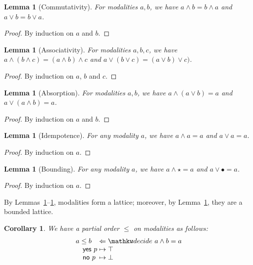 \documentclass{amsart}
\makeatletter
\newtheorem{corollary}[theorem]{Corollary}
\newtheorem{lemma}[theorem]{Lemma}
\newenvironment{proofof}[1][\proofname]{%
  \par\pushQED{\qed}\normalfont%
  \topsep6\p@\@plus6\p@\relax
\trivlist\item[\hskip\labelsep\bfseries#1\@addpunct{.}]%
  \ignorespaces
}{%
  \popQED\endtrivlist\@endpefalse
}
\makeatother
\begin{document}
\begin{lemma}[Commutativity]\label{lem:modality-commutativity}
  For modalities $a, b$, we have $a\land b = b\land a$ and $a\lor b
  = b\lor a$.
\end{lemma}
\begin{proof}
  By induction on $a$ and $b$.
\end{proof}

\begin{lemma}[Associativity]\label{lem:modality-associativity}
  For modalities $a, b, c$, we have $a\land (b\land c) = (a\land b)
  \land c$ and $a\lor (b\lor c) = (a \lor b) \lor c)$.
\end{lemma}
\begin{proof}
  By induction on $a$, $b$ and $c$.
\end{proof}

\begin{lemma}[Absorption]\label{lem:modality-absorption}
  For modalities $a, b$, we have $a\land (a\lor b) = a$ and $a\lor
  (a\land b) = a$.
\end{lemma}
\begin{proof}
  By induction on $a$ and $b$.
\end{proof}

\begin{lemma}[Idempotence]\label{lem:modality-idempotence}
  For any modality $a$, we have $a\land a = a$ and $a\lor a = a$.
\end{lemma}
\begin{proof}
  By induction on $a$.
\end{proof}

\begin{lemma}[Bounding]\label{lem:modality-bounding}
  For any modality $a$, we have $a\land\star = a$ and $a\lor\bullet = a$.
\end{lemma}
\begin{proof}
  By induction on $a$.
\end{proof}

\begin{proofof}[Proof of Theorem \ref{thm:modality-is-lattice}]
  By Lemmas~\ref{lem:modality-commutativity}--\ref{lem:modality-idempotence},
  modalities form a lattice; moreover, by
  Lemma~\ref{lem:modality-bounding}, they are a bounded lattice.
\end{proofof}

\begin{corollary}\label{cor:modality-porder}
  We have a partial order $\leq$ on modalities as follows:
  \[
    \arraycolsep=1.4pt
    \begin{array}{lcl}
      a\leq b &\Leftarrow &\decide{a\land b = a}\\
      \quad \con{yes}\ p &\mapsto &\top\\
      \quad \con{no}\ p &\mapsto &\bot
    \end{array}
  \]
\end{corollary}
\end{document}
